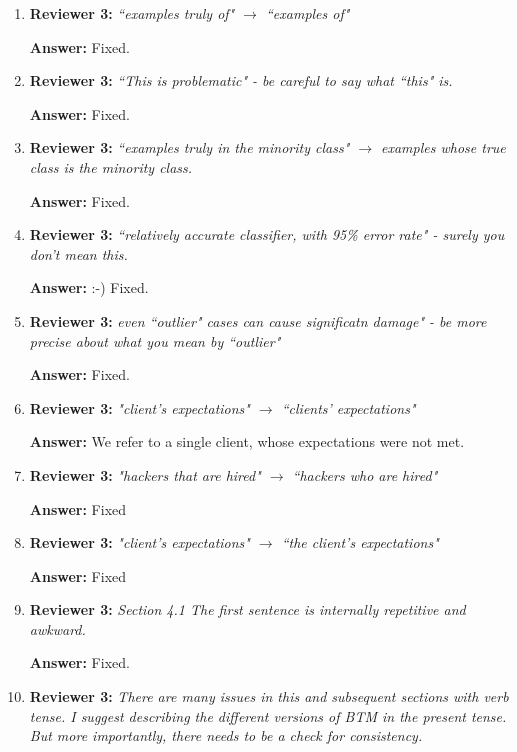 \documentclass[letterpaper]{article}
\begin{document}
\begin{enumerate}
\item \textbf{Reviewer 3:} \emph{ ``examples truly of" $\rightarrow$ ``examples of"}

\textbf{Answer:} Fixed.

\item \textbf{Reviewer 3:} \emph{ ``This is problematic" - be careful to say what ``this" is.}

\textbf{Answer:} Fixed.

\item \textbf{Reviewer 3:} \emph{ ``examples truly in the minority class" $\rightarrow$ examples whose true class is the minority class.}

\textbf{Answer:} Fixed.

\item \textbf{Reviewer 3:} \emph{ ``relatively accurate classifier, with 95\% error rate" - surely you don't mean this.}

\textbf{Answer:} :-) Fixed.

\item \textbf{Reviewer 3:} \emph{ even ``outlier" cases can cause significatn damage" - be more precise about what you mean by ``outlier"}

\textbf{Answer:} Fixed.

\item \textbf{Reviewer 3:} \emph{"client's expectations" $\rightarrow$ ``clients' expectations"}

\textbf{Answer:} We refer to a single client, whose expectations were not met.

\item \textbf{Reviewer 3:} \emph{"hackers that are hired" $\rightarrow$ ``hackers who are hired"}

\textbf{Answer:} Fixed

\item \textbf{Reviewer 3:} \emph{"client's expectations" $\rightarrow$ ``the client's expectations"}

\textbf{Answer:} Fixed

\item \textbf{Reviewer 3:} \emph{Section 4.1 The first sentence is internally repetitive and awkward.}

\textbf{Answer:} Fixed.

\item \textbf{Reviewer 3:} \emph{ There are many issues in this and subsequent sections with verb tense. I suggest describing the different versions of BTM in the present tense.  But more importantly, there needs to be a check for consistency.}


\end{enumerate}
\end{document}

